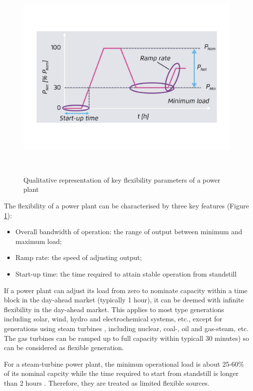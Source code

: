  \begin{figure}[h!]
	\label{fig:power-plant-flexibility}
	\includegraphics[scale=0.4]{Figures/PowerPlantFlexibility.pdf}
	\caption{Qualitative representation of key flexibility parameters of a power plant\cite{AgoraEnergiewende2017}}\
\end{figure}

The flexibility of a power plant can be characterised by three key features\cite{AgoraEnergiewende2017} (Figure \ref{fig:power-plant-flexibility}): 
\begin{itemize}
	\item Overall bandwidth of operation: the range of output between minimum and maximum load;
	\item Ramp rate: the speed of adjusting output;
	\item Start-up time: the time required to attain stable operation from standstill
\end{itemize}

If a power plant can adjust its load from zero to nominate capacity within a time block in the day-ahead market (typically 1 hour), it can be deemed with infinite flexibility in the day-ahead market. This applies to most type generations including solar, wind, hydro and electrochemical systems, etc., except for generations using steam turbines \cite{AgoraEnergiewende2017}, including nuclear, coal-, oil and gas-steam, etc. The gas turbines can be ramped up to full capacity within typicall 30 minutes\cite{Siemens}\cite{GE}) so can be considered as flexible generation.

For a steam-turbine power plant, the minimun operational load is about 25-60\% of its nominal capcity while the time required to start from standstill is longer than 2 hours \cite{AgoraEnergiewende2017}. Therefore, they are treated as limited flexible sources.

